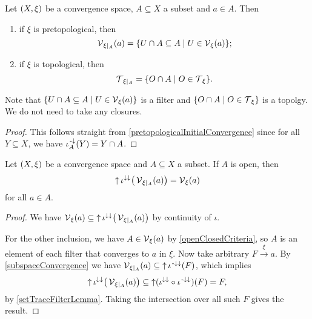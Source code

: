 \begin{lemma}
Let $\sSet{X,\xi}$ be a convergence space, $A\subseteq X$ a subset and $a\in A$. Then
\begin{enumerate}
\item if $\xi$ is pretopological, then
\[ \vicinity_{\xi|_A}(a) = \setbuilder{U\cap A\subseteq A}{U\in \vicinity_{\xi}(a)}; \]
\item if $\xi$ is topological, then
\[ \topology_{\xi|_A} = \setbuilder{O\cap A}{O\in \topology_{\xi}}. \]
\end{enumerate}
Note that $\setbuilder{U\cap A\subseteq A}{U\in \vicinity_{\xi}(a)}$ is a filter and $\setbuilder{O\cap A}{O\in \topology_{\xi}}$ is a topolgy. We do not need to take any closures.
\end{lemma}
\begin{proof}
This follows straight from \ref{pretopologicalInitialConvergence} since for all $Y\subseteq X$, we have $\operatorname{\iota}_A^{\text{\hspace{0.15em}-}\downarrow}(Y) = Y\cap A$.
\end{proof}

\begin{proposition} \label{subspaceVicinityFilter}
Let $\sSet{X,\xi}$ be a convergence space and $A\subseteq X$ a subset. If $A$ is open, then
\[ \operatorname{\uparrow}\iota^{\downarrow\downarrow}\big(\operatorname{\mathcal{V}}_{\xi|_A}(a)\big) = \operatorname{\mathcal{V}}_\xi(a) \]
for all $a\in A$.
\end{proposition}
\begin{proof}
We have $\operatorname{\mathcal{V}}_\xi(a) \subseteq \operatorname{\uparrow}\iota^{\downarrow\downarrow}\big(\operatorname{\mathcal{V}}_{\xi|_A}(a)\big)$ by continuity of $\iota$.

For the other inclusion, we have $A\in \operatorname{\mathcal{V}}_\xi(a)$ by \ref{openClosedCriteria}, so $A$ is an element of each filter that converges to $a$ in $\xi$. Now take arbitrary $F\overset{\xi}{\longrightarrow} a$. By \ref{subspaceConvergence} we have $\operatorname{\mathcal{V}}_{\xi|_A}(a) \subseteq \operatorname{\uparrow} \iota^{{\text{\hspace{0.15em}-}\downarrow}\downarrow}(F)$, which implies
\[ \operatorname{\uparrow} \iota^{\downarrow\downarrow}\big(\operatorname{\mathcal{V}}_{\xi|_A}(a)\big) \subseteq \operatorname{\uparrow} (\iota^{\downarrow\downarrow}\circ \iota^{{\text{\hspace{0.15em}-}\downarrow}\downarrow})(F) = F, \]
by \ref{setTraceFilterLemma}. Taking the intersection over all such $F$ gives the result.
\end{proof}

